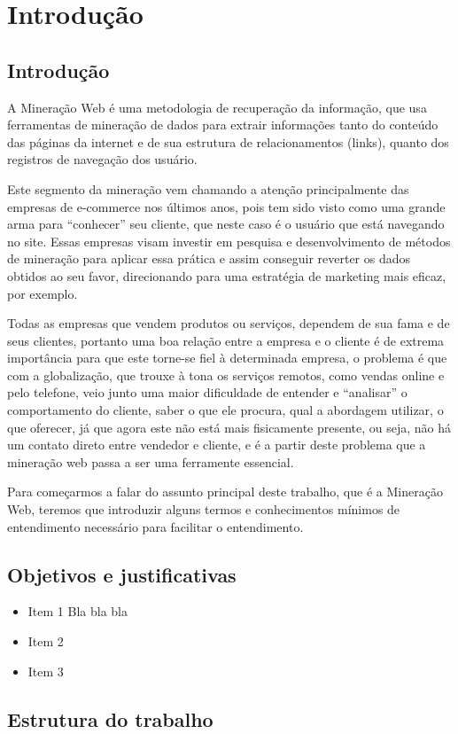 \chapter{Introdução}

\section{Introdução}
    A Mineração Web é uma metodologia de recuperação da informação, que usa ferramentas de mineração de dados para extrair informações tanto do conteúdo das páginas da internet e de sua estrutura de relacionamentos (links), quanto dos registros de navegação dos usuário.

	Este segmento da mineração vem chamando a atenção principalmente das empresas de e-commerce nos últimos anos, pois tem sido visto como uma grande arma para “conhecer” seu cliente, que neste caso é o usuário que está navegando no site. Essas empresas visam investir em pesquisa e desenvolvimento de métodos de mineração para aplicar essa prática e assim conseguir reverter os dados obtidos ao seu favor, direcionando para uma estratégia de marketing mais eficaz, por exemplo.

	Todas as empresas que vendem produtos ou serviços, dependem de sua fama e de seus clientes, portanto uma boa relação entre a empresa e o cliente é de extrema importância para que este torne-se fiel à determinada empresa, o problema é que com a globalização, que trouxe à tona os serviços remotos, como vendas online e pelo telefone, veio junto uma maior dificuldade de entender e “analisar” o comportamento do cliente, saber o que ele procura, qual a abordagem utilizar, o que oferecer, já que agora este não está mais fisicamente presente, ou seja, não há um contato direto entre vendedor e cliente, e é a partir deste problema que a mineração web passa a ser uma ferramente essencial.

	Para começarmos a falar do assunto principal deste trabalho, que é a Mineração Web, teremos que introduzir alguns termos e conhecimentos mínimos de entendimento necessário para facilitar o entendimento.

\section{Objetivos e justificativas}

\begin{itemize}
\item Item 1
Bla bla bla
\item Item 2
\item Item 3
\end{itemize}


\section{Estrutura do trabalho}

